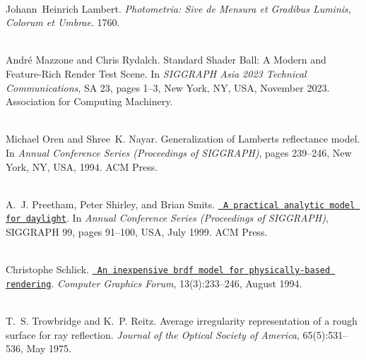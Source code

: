\begin{DoxyDescription}
\item[\label{citelist_CITEREF_Lambert:1760:Photometria}%
\Hypertarget{citelist_CITEREF_Lambert:1760:Photometria}%
\mbox{[}13\mbox{]}]\hfill \\
Johann~Heinrich Lambert. {\itshape Photometria\+: Sive de Mensura et Gradibus Luminis, Colorum et Umbrae}. 1760.


\item[\label{citelist_CITEREF_Mazzone:2023:Standard}%
\Hypertarget{citelist_CITEREF_Mazzone:2023:Standard}%
\mbox{[}14\mbox{]}]\hfill \\
Andr\'{e} Mazzone and Chris Rydalch. Standard Shader Ball\+: A Modern and Feature-\/\+Rich Render Test Scene. In {\itshape SIGGRAPH Asia 2023 Technical Communications}, SA \textquotesingle{}23, pages 1--3, New York, NY, USA, November 2023. Association for Computing Machinery. 


\item[\label{citelist_CITEREF_Oren:1994:Generalization}%
\Hypertarget{citelist_CITEREF_Oren:1994:Generalization}%
\mbox{[}15\mbox{]}]\hfill \\
Michael Oren and Shree~K. Nayar. Generalization of Lambert\textquotesingle{}s reflectance model. In {\itshape Annual Conference Series (Proceedings of SIGGRAPH)}, pages 239--246, New York, NY, USA, 1994. ACM Press. 


\item[\label{citelist_CITEREF_Preetham:1999:Practical}%
\Hypertarget{citelist_CITEREF_Preetham:1999:Practical}%
\mbox{[}16\mbox{]}]\hfill \\
A.~J. Preetham, Peter Shirley, and Brian Smits. \href{https://doi.org/10.1145/311535.311545}{\texttt{ A practical analytic model for daylight}}. In {\itshape Annual Conference Series (Proceedings of SIGGRAPH)}, SIGGRAPH \textquotesingle{}99, pages 91--100, USA, July 1999. ACM Press. 


\item[\label{citelist_CITEREF_Schlick:1994:BRDF}%
\Hypertarget{citelist_CITEREF_Schlick:1994:BRDF}%
\mbox{[}17\mbox{]}]\hfill \\
Christophe Schlick. \href{https://onlinelibrary.wiley.com/doi/abs/10.1111/1467-8659.1330233}{\texttt{ An inexpensive brdf model for physically-\/based rendering}}. {\itshape Computer Graphics Forum}, 13(3)\+:233--246, August 1994. 


\item[\label{citelist_CITEREF_Trowbridge:1975:Average}%
\Hypertarget{citelist_CITEREF_Trowbridge:1975:Average}%
\mbox{[}18\mbox{]}]\hfill \\
T.~S. Trowbridge and K.~P. Reitz. Average irregularity representation of a rough surface for ray reflection. {\itshape Journal of the Optical Society of America}, 65(5)\+:531--536, May 1975. 



\end{DoxyDescription}
